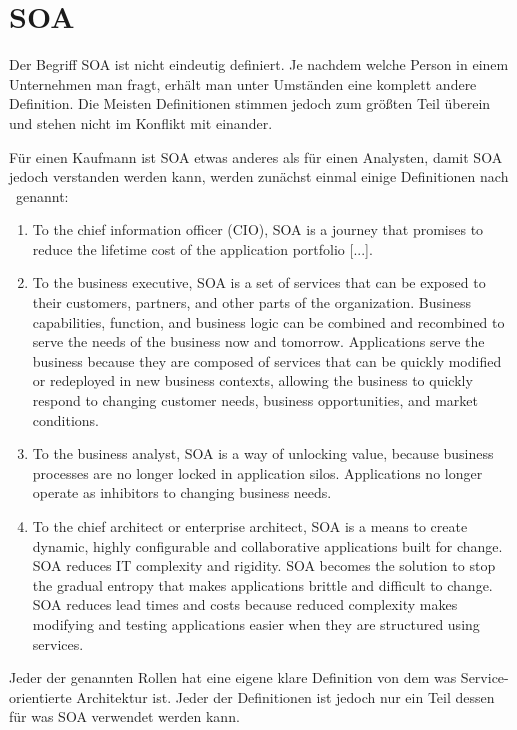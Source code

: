 \chapter{SOA}
\label{chap:soa}
Der Begriff SOA ist nicht eindeutig definiert. Je nachdem welche Person in einem Unternehmen man fragt, erhält man unter Umständen eine komplett andere Definition. \frqq Die Meisten Definitionen stimmen jedoch zum größten Teil überein und stehen nicht im Konflikt mit einander.\flqq\cite[vgl. Seite 6]{100QA}

Für einen Kaufmann ist SOA etwas anderes als für einen Analysten, damit SOA jedoch verstanden werden kann, werden zunächst einmal einige Definitionen nach \cite{100QA}\ genannt:
\begin{enumerate}
       \item \frqq To the chief information officer (CIO), SOA is a journey that
       promises to reduce the lifetime cost of the application portfolio [...].\flqq \cite[vgl. Seite 6]{100QA}
    
       \item \frqq To the business executive, SOA is a set of services that can be exposed to their customers, partners, and other parts of the organization. Business capabilities, function, and business logic can be combined and recombined to serve the needs of the business now and tomorrow. Applications serve the business because they are composed
       of services that can be quickly modified or redeployed in new
       business contexts, allowing the business to quickly respond to changing
       customer needs, business opportunities, and market conditions.\flqq \cite[vgl. Seite 6]{100QA}
       
       \item \frqq To the business analyst, SOA is a way of unlocking value, because business processes are no longer locked in application silos. Applications no longer operate as inhibitors to changing business needs.\flqq \cite[vgl. Seite 6]{100QA}
       
       \item \frqq To the chief architect or enterprise architect, SOA is a means to
       create dynamic, highly configurable and collaborative applications
       built for change. SOA reduces IT complexity and rigidity. SOA becomes the solution to stop the gradual entropy that makes applications
       brittle and difficult to change. SOA reduces lead times and costs
       because reduced complexity makes modifying and testing applications
       easier when they are structured using services.\flqq \cite[vgl. Seite ]{100QA}
\end{enumerate}
Jeder der genannten Rollen hat eine eigene klare Definition von dem was Service-orientierte Architektur ist. Jeder der Definitionen ist jedoch nur ein Teil dessen für was SOA verwendet werden kann.

